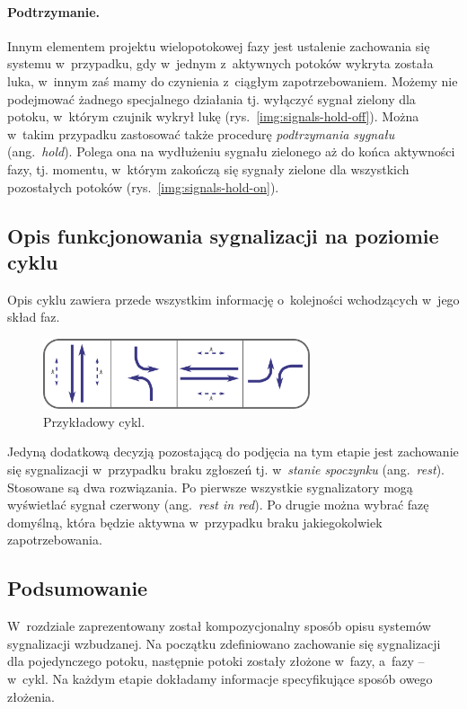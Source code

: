 \documentclass{pracamgr}
\newcommand{\ang}[1]{(ang.~\emph{#1})}
\newcommand{\imgr}[1]{rys.~\ref{#1}}
\theoremstyle{plain}
\begin{document}
\paragraph{Podtrzymanie.} Innym elementem projektu wielopotokowej fazy
jest ustalenie zachowania się systemu w~przypadku, gdy w~jednym
z~aktywnych potoków wykryta została luka, w~innym zaś mamy do
czynienia z~ciągłym zapotrzebowaniem. Możemy nie podejmować żadnego
specjalnego działania tj. wyłączyć sygnał zielony dla potoku, w~którym
czujnik wykrył lukę (\imgr{img:signals-hold-off}). Można w~takim
przypadku zastosować także procedurę \emph{podtrzymania sygnału}
\ang{hold}. Polega ona na wydłużeniu sygnału zielonego aż do końca
aktywności fazy, tj. momentu, w~którym zakończą się sygnały zielone
dla wszystkich pozostałych potoków (\imgr{img:signals-hold-on}).

\subsection{Opis funkcjonowania sygnalizacji na poziomie cyklu}
Opis cyklu zawiera przede wszystkim informację o~kolejności
wchodzących w~jego skład faz.
\begin{figure} \centering
  \includegraphics[width=0.7\textwidth]{img/signals-cycle-example}
  \caption{Przykładowy cykl.}
\end{figure}
Jedyną dodatkową decyzją pozostającą do podjęcia na tym etapie jest
zachowanie się sygnalizacji w~przypadku braku zgłoszeń tj.
w~\emph{stanie spoczynku} \ang{rest}. Stosowane są dwa rozwiązania. Po
pierwsze wszystkie sygnalizatory mogą wyświetlać sygnał czerwony
\ang{rest in red}. Po drugie można wybrać fazę domyślną, która będzie
aktywna w~przypadku braku jakiegokolwiek zapotrzebowania.

\subsection{Podsumowanie}
\label{ss:signals:actuated:summary}
W~rozdziale zaprezentowany został kompozycjonalny sposób opisu
systemów sygnalizacji wzbudzanej. Na początku zdefiniowano zachowanie
się sygnalizacji dla pojedynczego potoku, następnie potoki zostały
złożone w~fazy, a~fazy -- w~cykl. Na każdym etapie dokładamy
informacje specyfikujące sposób owego złożenia.
\end{document}
